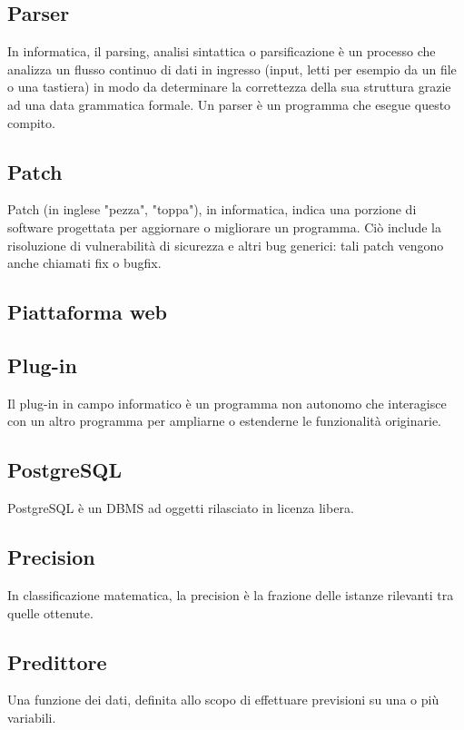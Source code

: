 
\subsection*{Parser}
In informatica, il parsing, analisi sintattica o parsificazione è un processo che analizza un flusso continuo di dati in ingresso (input, letti per esempio da un file o una tastiera) in modo da determinare la correttezza della sua struttura grazie ad una data grammatica formale. Un parser è un programma che esegue questo compito. 

\subsection*{Patch}
Patch (in inglese "pezza", "toppa"), in informatica, indica una porzione di software progettata per aggiornare o migliorare un programma. Ciò include la risoluzione di vulnerabilità di sicurezza e altri bug generici: tali patch vengono anche chiamati fix o bugfix.

\subsection*{Piattaforma web}

\subsection*{Plug-in}
Il plug-in in campo informatico è un programma non autonomo che interagisce con un altro programma per ampliarne o estenderne le funzionalità originarie.

\subsection*{PostgreSQL}
PostgreSQL è un DBMS ad oggetti rilasciato in licenza libera.

\subsection*{Precision}
In classificazione matematica, la precision è la frazione delle istanze rilevanti tra quelle ottenute.

\subsection*{Predittore}
Una funzione dei dati, definita allo scopo di effettuare previsioni su una o più variabili.

